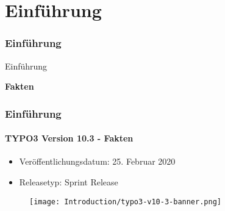 %

\section{Einführung}
\begin{frame}[fragile]
	\frametitle{Einführung}

	\begin{center}\huge{Einführung}\end{center}
	\begin{center}\huge{\color{typo3darkgrey}\textbf{Fakten}}\end{center}

\end{frame}


\begin{frame}[fragile]
	\frametitle{Einführung}
	\framesubtitle{TYPO3 Version 10.3 - Fakten}

	\begin{itemize}
		\item Veröffentlichungsdatum: 25. Februar 2020
		\item Releasetyp: Sprint Release
	\end{itemize}

	\begin{figure}
		\texttt{[image: Introduction/typo3-v10-3-banner.png]}
	\end{figure}

\end{frame}


